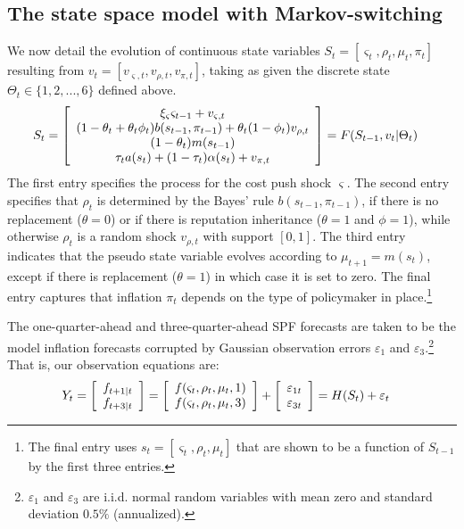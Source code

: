 \documentclass[12pt,letter,leqno]{article}
\theoremstyle{asn}
\theoremstyle{lem}
\theoremstyle{slem}
\theoremstyle{prop}
\theoremstyle{appprop}
\theoremstyle{rem}
\theoremstyle{defn}
\begin{document}
\subsection{The state space model with Markov-switching}\label{sec:stateextraction}
We now detail the evolution of continuous state variables $S_{t}=[\varsigma_{t}, \rho_{t},\mu_{t}, \pi_{t}]$ resulting from $v_t =[v_{\varsigma,t}, v_{\rho,t}, v_{\pi,t}]$, taking as given the discrete state $\Theta_t \in \{1,2,...,6\}$ defined above. 
\begin{align*}
S_{t}  &  =\left[
\begin{array}
[c]{c}%
\xi_\varsigma\varsigma_{t-1}+v_{\varsigma,t}\\
(1-\theta_{t}+\theta_{t}\phi_{t})b(s_{t-1},\pi_{t-1}
)+\theta_{t}(1-\phi_{t})v_{\rho,t}\\
(1-\theta_{t})m(s_{t-1})\\
\tau_{t}a(s_t)+(1-\tau_{t})\alpha(s_t)+v_{\pi,t}%
\end{array}
\right] =F(S_{t-1},v_{t}|\Theta_{t})
\end{align*}
The first entry specifies the process for the cost push shock $\varsigma$. The second entry specifies that $\rho_{t}$ is determined by the Bayes' rule $b(s_{t-1},\pi_{t-1})$, if there is no replacement ($\theta=0$) or if there is reputation inheritance ($\theta=1$ and $\phi=1$), while otherwise $\rho_{t}$ is a random shock $v_{\rho,t}$ with support $[0,1]$. The third entry indicates that the pseudo state variable evolves according to $\mu_{t+1}=m(s_{t})$, except if there is replacement ($\theta=1$) in which case it is set to zero. The final entry captures that inflation $\pi_{t}$ depends on the type of policymaker in place.\footnote{The final entry uses $s_t=[\varsigma_t,\rho_t,\mu_t]$ that are shown to be a function of $S_{t-1}$ by the first three entries.}



The one-quarter-ahead and three-quarter-ahead SPF forecasts are taken to be the model inflation forecasts corrupted by Gaussian observation errors $\varepsilon_1$ and $\varepsilon_3$.\footnote{$\varepsilon_1$ and $\varepsilon_3$ are i.i.d. normal random variables with mean zero and standard deviation $0.5\%$ (annualized).} That is, our observation equations are:
\begin{align*}
Y_{t}&=\left[
\begin{array}
[c]{c}%
f_{t+1|t}\\
f_{t+3|t}\\
\end{array}
\right]  =\left[
\begin{array}
[c]{c}%
f(\varsigma_{t},\rho_{t},\mu_{t},1)\\
f(\varsigma_{t},\rho_{t},\mu_{t},3)\\
\end{array}
\right]  +\left[
\begin{array}
[c]{c}%
\varepsilon_{1t}\\
\varepsilon_{3t}\\
\end{array}
\right] =H(S_{t}) + \varepsilon_{t}
\end{align*}
\end{document}
